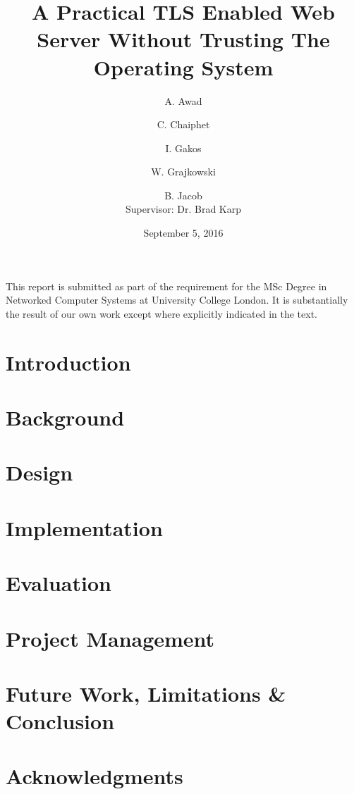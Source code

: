 \documentclass{article}
\title{A Practical TLS Enabled Web Server Without Trusting The Operating
System}
\author{A. Awad}
\author{C. Chaiphet}
\author{I. Gakos}
\author{W. Grajkowski}
\author{B. Jacob \\\small Supervisor: Dr. Brad Karp}
\date{September 5, 2016}
\affil{MSc in Networked Computer Systems \\University College London}
\begin{document}

\begin{titlepage}
  \maketitle
  \vfill \tiny
  \noindent
  This report is submitted as part of the requirement for the MSc
  Degree in Networked Computer Systems at University College
  London. It is substantially the result of our own work except where
  explicitly indicated in the text.
\end{titlepage}


\begin{abstract}
  
\end{abstract}
\newpage

\tableofcontents
\newpage


\section{Introduction}
\label{sec:introduction}

\newpage

\section{Background}
\label{sec:background}

\newpage

\section{Design}
\label{sec:design}

\newpage

\section{Implementation}
\label{sec:implementation}

\newpage

\section{Evaluation}
\label{sec:perfeval}

\newpage

\section{Project Management}
\label{sec:projectmgmt}

\newpage

\section{Future Work, Limitations \& Conclusion}
\label{sec:flconclusion}


\section{Acknowledgments}

\newpage

\printbibliography
\end{document}
